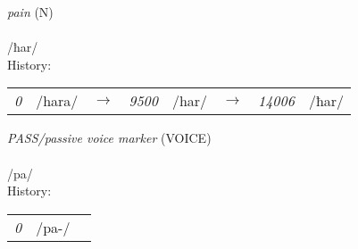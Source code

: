 \vspace{15pt}
\begin{nopagebreak}
 \textit{pain} (N)\\
\\
\noindent /ħ{\textprimstress}ar/\\


\noindent History:

\vspace{-0pt}
\hspace{40pt}
\begin{tabular}{ccc}
\textit{0} & /hara/&$\rightarrow$ & \textit{9500} & /har/&$\rightarrow$ & \textit{14006} & /ħar/& \\
\end{tabular}

\vspace{20pt}\hline

\end{nopagebreak}
\filbreak



\vspace{15pt}
\begin{nopagebreak}
 \textit{PASS/passive voice marker} (VOICE)\\
\\
\noindent /p{\textprimstress}a/\\


\noindent History:

\vspace{-0pt}
\hspace{40pt}
\begin{tabular}{ccc}
\textit{0} & /pa-/& \\
\end{tabular}

\vspace{20pt}\hline

\end{nopagebreak}
\filbreak




